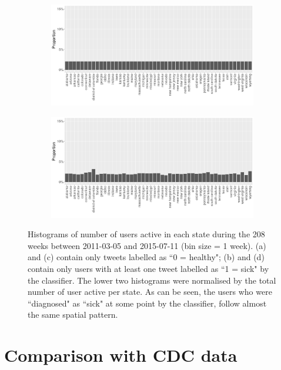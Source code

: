 \documentclass[11pt, a4paper]{report}\usepackage[]{graphicx}\usepackage[]{color}
\begin{document}
\begin{figure}[H]
    \begin{subfigure}[t]{0.49\textwidth}
  \includegraphics[width=1\linewidth]{activity_rel_healthy_user_statename_Twitter_full_aggregated.png}
  \caption{}
  \end{subfigure}
  \hfill
    \begin{subfigure}[t]{0.49\textwidth}
  \includegraphics[width=1\linewidth]{activity_rel_sick_user_statename_Twitter_full_aggregated.png}
  \caption{}
  \end{subfigure}
  \caption{Histograms of number of users active in each state during the 208 weeks between 2011-03-05 and 2015-07-11 (bin size = 1 week). (a) and (c) contain only tweets labelled as ``0 = healthy"; (b) and (d) contain only users with at least one tweet labelled as ``1 = sick" by the classifier. The lower two histograms were normalised by the total number of user active per state. As can be seen, the users who were ``diagnosed" as ``sick" at some point by the classifier, follow almost the same spatial pattern.}
  \label{fig:tweets_state_healthy_sick_user}
\end{figure}

\section{Comparison with CDC data}
\label{sec:comp_cdc}
\end{document}
